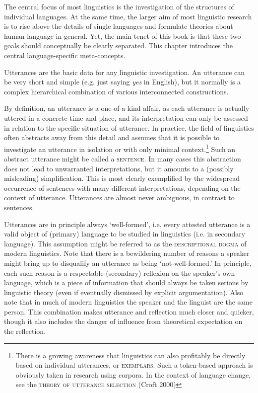 \label{ch:languagespecific}

The central focus of most linguistics is the investigation of the structures of individual languages. At the same time, the larger aim of most linguistic research is to rise above the details of single languages and formulate theories about human language in general. Yet, the main tenet of this book is that these two goals should conceptually be clearly separated. This chapter introduces the central language-specific meta-concepts.

%
Utterances are the basic data for any linguistic investigation. An utterance can be very short and simple (e.g. just saying \emph{yes} in English), but it normally is a complex hierarchical combination of various interconnected constructions. 

By definition, an utterance is a one-of-a-kind affair, as each utterance is actually uttered in a concrete time and place, and its interpretation can only be assessed in relation to the specific situation of utterance. In practice, the field of linguistics often abstracts away from this detail and assumes that it is possible to investigate an utterance in isolation or with only minimal context.\footnote{There is a growing awareness that linguistics can also profitably be directly based on individual utterances, or \textsc{exemplars}. Such a token-based approach is obviously taken in research using corpora. In the context of language change, see the \textsc{theory of utterance selection} (Croft 2000)} Such an abstract utterance might be called a \textsc{sentence}. In many cases this abstraction does not lead to unwarranted interpretations, but it amounts to a (possibly misleading) simplification. This is most clearly exemplified by the widespread occurrence of sentences with many different interpretations, depending on the context of utterance. Utterances are almost never ambiguous, in contrast to sentences.

Utterances are in principle always `well-formed', i.e. every attested utterance is a valid object of (primary) language to be studied in linguistics (i.e. in secondary language). This assumption might be referred to as the \textsc{descriptional dogma} of modern linguistics. Note that there is a bewildering number of reasons a speaker might bring up to disqualify an utterance as being `not-well-formed.' In principle, each such reason is a respectable (secondary) reflexion on the speaker's own language, which is a piece of information that should always be taken serious by linguistic theory (even if eventually dismissed by explicit argumentation). Also note that in much of modern linguistics the speaker and the linguist are the same person. This combination makes utterance and reflection much closer and quicker, though it also includes the danger of influence from theoretical expectation on the reflection.

